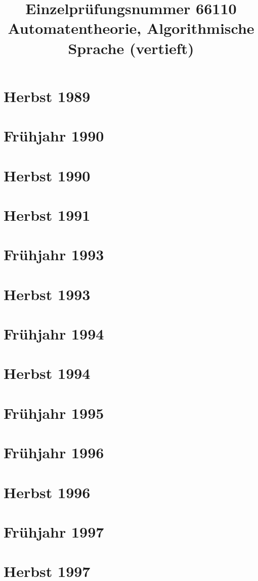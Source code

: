 \documentclass{lehramt-informatik-examen-sammlung}
\title{Einzelprüfungsnummer 66110\\Automatentheorie, Algorithmische Sprache (vertieft)}
\begin{document}
\maketitle
\tableofcontents

\section{Herbst 1989}


\section{Frühjahr 1990}


\section{Herbst 1990}


\section{Herbst 1991}


\section{Frühjahr 1993}


\section{Herbst 1993}


\section{Frühjahr 1994}


\section{Herbst 1994}


\section{Frühjahr 1995}


\section{Frühjahr 1996}


\section{Herbst 1996}


\section{Frühjahr 1997}


\section{Herbst 1997}

\end{document}
